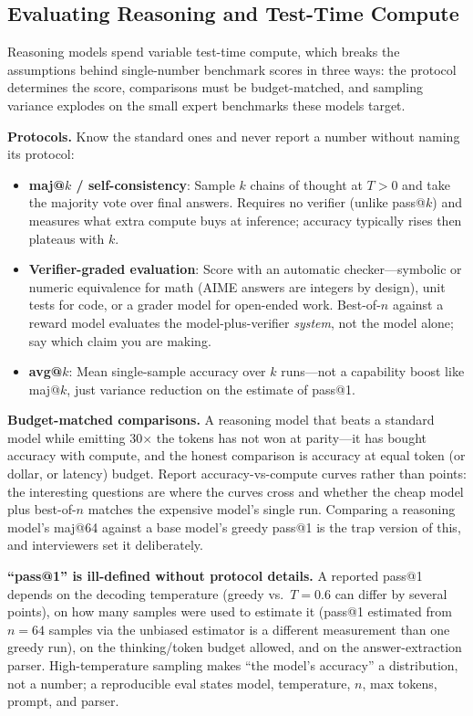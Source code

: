\subsection{Evaluating Reasoning and Test-Time Compute}
\label{sec:reasoning_eval}

Reasoning models spend variable test-time compute, which breaks the assumptions behind single-number benchmark scores in three ways: the protocol determines the score, comparisons must be budget-matched, and sampling variance explodes on the small expert benchmarks these models target.

\textbf{Protocols.} Know the standard ones and never report a number without naming its protocol:
\begin{itemize}
    \item \textbf{maj@$k$ / self-consistency}: Sample $k$ chains of thought at $T > 0$ and take the majority vote over final answers. Requires no verifier (unlike pass@$k$) and measures what extra compute buys at inference; accuracy typically rises then plateaus with $k$.
    \item \textbf{Verifier-graded evaluation}: Score with an automatic checker---symbolic or numeric equivalence for math (AIME answers are integers by design), unit tests for code, or a grader model for open-ended work. Best-of-$n$ against a reward model evaluates the model-plus-verifier \textit{system}, not the model alone; say which claim you are making.
    \item \textbf{avg@$k$}: Mean single-sample accuracy over $k$ runs---not a capability boost like maj@$k$, just variance reduction on the estimate of pass@1.
\end{itemize}

\textbf{Budget-matched comparisons.} A reasoning model that beats a standard model while emitting 30$\times$ the tokens has not won at parity---it has bought accuracy with compute, and the honest comparison is accuracy at equal token (or dollar, or latency) budget. Report accuracy-vs-compute curves rather than points: the interesting questions are where the curves cross and whether the cheap model plus best-of-$n$ matches the expensive model's single run. Comparing a reasoning model's maj@64 against a base model's greedy pass@1 is the trap version of this, and interviewers set it deliberately.

\textbf{``pass@1'' is ill-defined without protocol details.} A reported pass@1 depends on the decoding temperature (greedy vs.\ $T = 0.6$ can differ by several points), on how many samples were used to estimate it (pass@1 estimated from $n = 64$ samples via the unbiased estimator is a different measurement than one greedy run), on the thinking/token budget allowed, and on the answer-extraction parser. High-temperature sampling makes ``the model's accuracy'' a distribution, not a number; a reproducible eval states model, temperature, $n$, max tokens, prompt, and parser.

